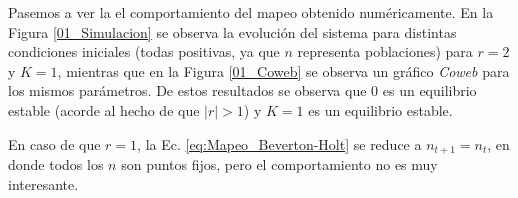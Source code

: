 Pasemos a ver la el comportamiento del mapeo obtenido numéricamente. En la Figura \ref{01_Simulacion} se observa la evolución del sistema para distintas condiciones iniciales (todas positivas, ya que $n$ representa poblaciones) para $r=2$ y $K=1$, mientras que en la Figura \ref{01_Coweb} se observa un gráfico \textit{Coweb} para los mismos parámetros. De estos resultados se observa que $0$ es un equilibrio estable (acorde al hecho de que $|r|>1$) y $K=1$ es un equilibrio estable.


En caso de que $r=1$, la Ec. \ref{eq:Mapeo_Beverton-Holt} se reduce a $n_{t+1} = n_t$, en donde todos los $n$ son puntos fijos, pero el comportamiento no es muy interesante.